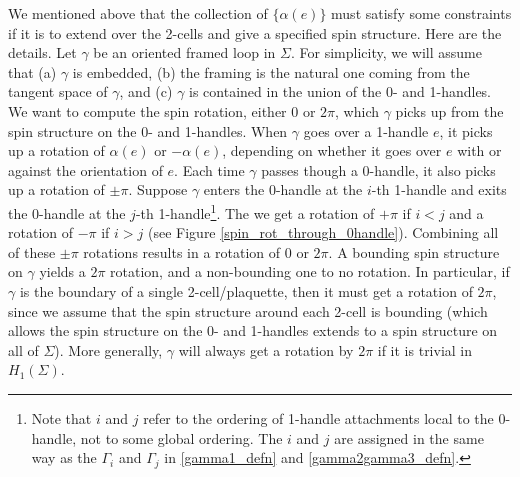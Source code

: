 \documentclass[12pt,a4paper]{article}
\begin{document}
We mentioned above that the collection of $\{\alpha(e)\}$ must satisfy some constraints if it is 
to extend over the 2-cells and give a specified spin structure.
Here are the details.
Let $\gamma$ be an oriented framed loop in $\Sigma$.
For simplicity, we will assume that (a) $\gamma$ is embedded, (b) the framing is the natural one coming from the tangent 
space of $\gamma$, and (c) $\gamma$ is contained in the union of the 0- and 1-handles.
We want to compute the spin rotation, either 0 or $2\pi$, which $\gamma$ picks up from the spin structure on the 0- and 1-handles.
When $\gamma$ goes over a 1-handle $e$, it picks up a rotation of $\alpha(e)$ or $-\alpha(e)$, depending on whether it goes over $e$
with or against the orientation of $e$.
Each time $\gamma$ passes though a 0-handle, it also picks up a rotation of $\pm\pi$.
Suppose $\gamma$ enters the 0-handle at the $i$-th 1-handle and exits the 0-handle at the $j$-th 1-handle\footnote{Note that $i$ and $j$ refer to the ordering of 1-handle attachments local to the 0-handle, not to some global ordering. The $i$ and $j$ are assigned in the same way as the $\Gamma_i$ and $\Gamma_j$ in \eqref{gamma1_defn} and \eqref{gamma2gamma3_defn}.}.
The we get a rotation of $+\pi$ if $i<j$ and a rotation of $-\pi$ if $i > j$ (see Figure \ref{spin_rot_through_0handle}).
Combining all of these $\pm\pi$ rotations results in a rotation of 0 or $2\pi$.
A bounding spin structure on $\gamma$ yields a $2\pi$ rotation, and a non-bounding one to no rotation.
In particular, if $\gamma$ is the boundary of a single 2-cell/plaquette, then it must get a rotation of $2\pi$, since we assume that the spin structure around each 2-cell is bounding (which allows the spin structure on the 0- and 1-handles extends to a spin structure on all of $\Sigma$). 
More generally, $\gamma$ will always get a rotation by $2\pi$ if it is trivial in $H_1(\Sigma)$.



\medskip
\end{document}
